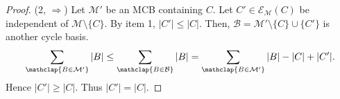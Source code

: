 \documentclass[fleqn,11pt]{article}
\newcommand\calB{\mathcal{B}}
\newcommand\calM{\mathcal{M}}
\newcommand\RelCyc{\mathcal{C_R}} %
\newcommand\expand[2]{\mathcal{E}_{#1}\left(#2\right)}   %
\begin{document}
\begin{proof}
	(2, $\Rightarrow$) 
		Let $\calM'$ be an MCB containing $C$. 
		Let $C'\in\expand{\calM}{C}$ be independent of $\calM\setminus\{C\}$. By item 1, $|C'|\le |C|$. 
		Then, $\calB=\calM'\setminus\{C\}\cup\{C'\}$ is another cycle basis.
		\begin{equation}
			\sum_{\mathclap{B\in\calM'}} |B| \le \sum_{\mathclap{B\in\calB}} |B| = \sum_{\mathclap{B\in\calM'}} |B| - |C| + |C'|.
		\end{equation}
		Hence $|C'|\ge|C|$. Thus $|C'|=|C|$.
%	
%	
%	 
\end{proof}
\end{document}
